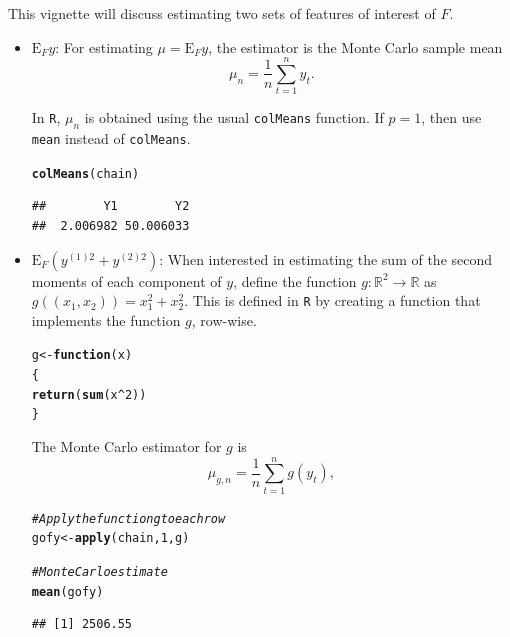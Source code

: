 \documentclass[11pt]{article}\usepackage[]{graphicx}\usepackage[]{color}
\makeatletter
\newcommand{\hlnum}[1]{\textcolor[rgb]{0.686,0.059,0.569}{#1}}%
\newcommand{\hlcom}[1]{\textcolor[rgb]{0.678,0.584,0.686}{\textit{#1}}}%
\newcommand{\hlopt}[1]{\textcolor[rgb]{0,0,0}{#1}}%
\newcommand{\hlstd}[1]{\textcolor[rgb]{0.345,0.345,0.345}{#1}}%
\newcommand{\hlkwa}[1]{\textcolor[rgb]{0.161,0.373,0.58}{\textbf{#1}}}%
\newcommand{\hlkwb}[1]{\textcolor[rgb]{0.69,0.353,0.396}{#1}}%
\newcommand{\hlkwc}[1]{\textcolor[rgb]{0.333,0.667,0.333}{#1}}%
\newcommand{\hlkwd}[1]{\textcolor[rgb]{0.737,0.353,0.396}{\textbf{#1}}}%
\newenvironment{kframe}{%
 \def\at@end@of@kframe{}%
 \ifinner\ifhmode%
  \def\at@end@of@kframe{\end{minipage}}%
  \begin{minipage}{\columnwidth}%
 \fi\fi%
 \def\FrameCommand##1{\hskip\@totalleftmargin \hskip-\fboxsep
 \colorbox{shadecolor}{##1}\hskip-\fboxsep
     \hskip-\linewidth \hskip-\@totalleftmargin \hskip\columnwidth}%
 \MakeFramed {\advance\hsize-\width
   \@totalleftmargin\z@ \linewidth\hsize
   \@setminipage}}%
 {\par\unskip\endMakeFramed%
 \at@end@of@kframe}
\newenvironment{knitrout}{}{} %
\makeatother
\begin{document}
\bigskip
This vignette will discuss estimating two sets of features of interest of $F$.
\begin{itemize}
\item $\text{E}_F y$: For estimating $\mu = \text{E}_Fy$, the estimator is the Monte Carlo sample mean
\[ \mu_n = \dfrac{1}{n} \displaystyle \sum_{t=1}^{n} y_t.\]

In \texttt{R}, $\mu_n$ is obtained using the usual \texttt{colMeans} function. If $p = 1$, then use \texttt{mean} instead of \texttt{colMeans}.

\begin{knitrout}
\color{fgcolor}\begin{kframe}
\begin{alltt}
\hlkwd{colMeans}\hlstd{(chain)}
\end{alltt}
\begin{verbatim}
##        Y1        Y2 
##  2.006982 50.006033
\end{verbatim}
\end{kframe}
\end{knitrout}
  
\item $\text{E}_F \left(y^{(1)2} + y^{(2)2} \right)$: When interested in estimating the sum of the second moments of each component of $y$,  define the function $g: \mathbb{R}^2 \to \mathbb{R}$ as $g((x_1,x_2)) = x_1^2 + x_2^2$. This is defined in \texttt{R} by creating a function that implements the function $g$, row-wise.

\begin{knitrout}
\color{fgcolor}\begin{kframe}
\begin{alltt}
\hlstd{g} \hlkwb{<-} \hlkwa{function}\hlstd{(}\hlkwc{x}\hlstd{)}
\hlstd{\{}
  \hlkwd{return}\hlstd{(}\hlkwd{sum}\hlstd{(x}\hlopt{^}\hlnum{2}\hlstd{))}
\hlstd{\}}
\end{alltt}
\end{kframe}
\end{knitrout}

The Monte Carlo estimator for $g$ is 
\[ \mu_{g,n} = \dfrac{1}{n} \displaystyle \sum_{t=1}^{n} g(y_t),\]

\begin{knitrout}
\color{fgcolor}\begin{kframe}
\begin{alltt}
\hlcom{# Apply the function g to each row}
\hlstd{gofy} \hlkwb{<-} \hlkwd{apply}\hlstd{(chain,} \hlnum{1}\hlstd{, g)}

\hlcom{# Monte Carlo estimate}
\hlkwd{mean}\hlstd{(gofy)}
\end{alltt}
\begin{verbatim}
## [1] 2506.55
\end{verbatim}
\end{kframe}
\end{knitrout}
\end{itemize}
\end{document}
